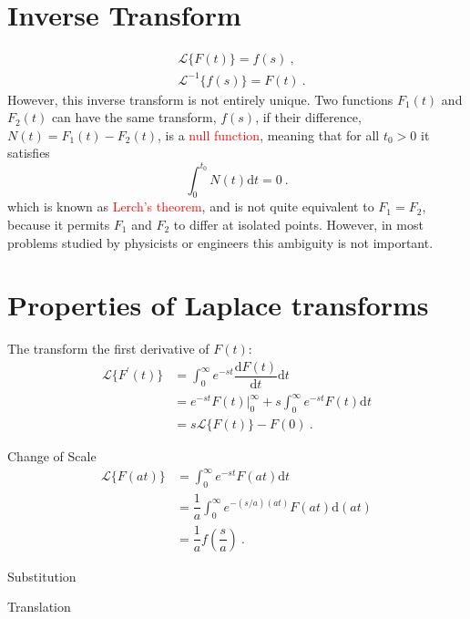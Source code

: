 \documentclass[12pt,a4paper]{article}
\newcommand{\dif}{\mathrm{d}}
\newcounter{theo}[section]\setcounter{theo}{0}
\begin{document}
\section{Inverse Transform}
\begin{align}
& \mathcal L \{F(t) \} = f(s) ~, \\
&  \mathcal L^{-1} \{f(s) \} = F(t) ~.
\end{align}
However, this inverse transform is not entirely unique. Two functions $F_1(t)$ and $F_2(t)$ can have the same transform, $f(s)$, if their difference, $N(t)=F_1(t) - F_2(t)$, is a \textcolor{red}{null function}, meaning that for all $t_0 > 0$ it satisfies
\begin{equation*}
\int_0^{t_0} N(t) \dif t = 0 ~.
\end{equation*}
which is known as \textcolor{red}{Lerch's theorem}, and is not quite equivalent to $F_1 = F_2$, because it permits $F_1$ and $F_2$ to differ at isolated points. However, in most problems studied by physicists or engineers this ambiguity is not important. 








\section{Properties of Laplace transforms}
The transform the first derivative of $F(t)$:
\begin{align}
\nonumber \mathcal L \{F^\prime(t) \} &= \int_0^\infty e^{-st} \dfrac{\dif F(t)}{\dif t} \dif t  \\
\nonumber & = e^{-st} F(t) \Big|_0^\infty +s\int_0^\infty e^{-st} F(t) \dif t \\
&= s \mathcal L \{F(t) \} -F(0) ~.
\end{align}

Change of Scale
\begin{align}
\nonumber \mathcal L \{F(at) \} &= \int_0^\infty e^{-st} F(at) \dif t  \\
\nonumber & = \dfrac{1}{a} \int_0^\infty e^{-(s/a) (at)} F(at) \dif (at) \\
&= \dfrac{1}{a} f\left(\dfrac{s}{a} \right)  ~.
\end{align}

Substitution



Translation
\end{document}
